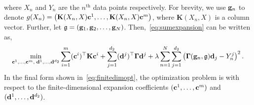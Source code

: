 where $X_n$ and $Y_n$ are the $n^{\text{th}}$ data points respectively. For brevity, we use $\mathbf{g}_n$ to denote $g(X_n) = \left(\mathbf{K}(X_n, X) \mathbf{c}^1, \dots, \mathbf{K}(X_n, X) \mathbf{c}^m \right)$, where $\mathbf{K}(X_n, X)$ is a column vector. Further, let $\mathfrak{g} = (\mathbf{g}_1, \mathbf{g}_2, \dots, \mathbf{g}_N)$. Then,~\eqref{eq:sumexpansion} can be written as,
\begin{align}
\min_{\mathbf{c}^1,\ldots,\mathbf{c}^m,\; \mathbf{d}^1,\ldots,\mathbf{d}^{d_2}} 
\sum_{i=1}^m (\mathbf{c}^i)^\top \mathbf{K} \mathbf{c}^i
+ \sum_{j=1}^{d_2} (\mathbf{d}^j)^\top \mathbf{\Gamma} \mathbf{d}^j
+ \lambda \sum\limits_{n=1}^N \sum\limits_{j=1}^{d_2} \left( \mathbf{\Gamma}(\mathbf{g}_n, \mathfrak{g}) \mathbf{d}_j - Y^j_n \right)^2. \label{eq:finitedimopt}
\end{align}
In the final form shown in~\eqref{eq:finitedimopt}, the optimization problem is with respect to the finite-dimensional expansion coefficients $(\mathbf{c}^1, \dots, \mathbf{c}^m)$ and $(\mathbf{d}^1, \dots, \mathbf{d}^{d_2})$.
